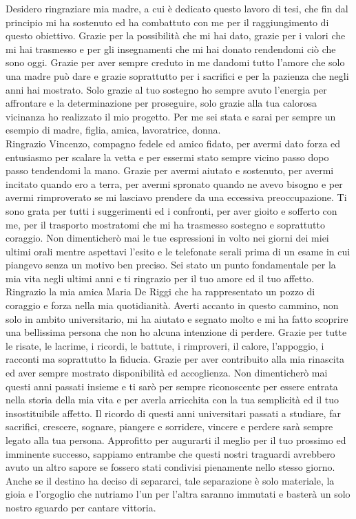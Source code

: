 \documentclass[12pt,a4paper,oneside]{book}
\begin{document}
Desidero ringraziare mia madre, a cui è dedicato questo lavoro di tesi, che fin dal principio mi ha sostenuto ed ha combattuto con me per il raggiungimento di questo obiettivo. Grazie per la possibilità che mi hai dato, grazie per i valori che mi hai trasmesso e per gli insegnamenti che mi hai donato rendendomi ciò che sono oggi. Grazie per aver sempre creduto in me dandomi tutto l'amore che solo una madre può dare e grazie soprattutto per i sacrifici e per la pazienza che negli anni hai mostrato. Solo grazie al tuo sostegno ho sempre avuto l'energia per affrontare e la determinazione per proseguire, solo grazie alla tua calorosa vicinanza ho realizzato il mio progetto. Per me sei stata e sarai per sempre un esempio di madre, figlia, amica, lavoratrice, donna.\\
Ringrazio Vincenzo, compagno fedele ed amico fidato, per avermi dato forza ed entusiasmo per scalare la vetta e per essermi stato sempre vicino passo dopo passo tendendomi la mano. Grazie per avermi aiutato e sostenuto, per avermi incitato quando ero a terra, per avermi spronato quando ne avevo bisogno e per avermi rimproverato se mi lasciavo prendere da una eccessiva preoccupazione. Ti sono grata per tutti i suggerimenti ed i confronti, per aver gioito e sofferto con me, per il trasporto mostratomi che mi ha trasmesso sostegno e soprattutto coraggio. Non dimenticherò mai le tue espressioni in volto nei giorni dei miei ultimi orali mentre aspettavi l'esito e le telefonate serali prima di un esame in cui piangevo senza un motivo ben preciso. Sei stato un punto fondamentale per la mia vita negli ultimi anni e ti ringrazio per il tuo amore ed il tuo affetto.\\
Ringrazio la mia amica Maria De Riggi che ha rappresentato un pozzo di coraggio e forza nella mia quotidianità. Averti accanto in questo cammino, non solo in ambito universitario, mi ha aiutato e segnato molto e mi ha fatto scoprire una bellissima persona che non ho alcuna intenzione di perdere. Grazie per tutte le risate, le lacrime, i ricordi, le battute, i rimproveri, il calore, l'appoggio, i racconti ma soprattutto la fiducia. Grazie per aver contribuito alla mia rinascita ed aver sempre mostrato disponibilità ed accoglienza. Non dimenticherò mai questi anni passati insieme e ti sarò per sempre riconoscente per essere entrata nella storia della mia vita e per averla arricchita con la tua semplicità ed il tuo insostituibile affetto. Il ricordo di questi anni universitari passati a studiare, far sacrifici, crescere, sognare, piangere e sorridere, vincere e perdere sarà sempre legato alla tua persona. Approfitto per augurarti il meglio per il tuo prossimo ed imminente successo, sappiamo entrambe che questi nostri traguardi avrebbero avuto un altro sapore se fossero stati condivisi pienamente nello stesso giorno. Anche se il destino ha deciso di separarci, tale separazione è solo materiale, la gioia e l'orgoglio che nutriamo l'un per l'altra saranno immutati e basterà un solo nostro sguardo per cantare vittoria.\\
\end{document}
